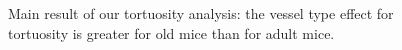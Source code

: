 \documentclass[
  letterpaper,
  DIV=11,
  numbers=noendperiod,
  oneside]{scrartcl}
\theoremstyle{plain}
\theoremstyle{remark}
\begin{document}
\begin{figure}


\caption{\label{fig-tortuosity-effects-detail}Main result of our
tortuosity analysis: the vessel type effect for tortuosity is greater
for old mice than for adult mice.}

\end{figure}%
\end{document}
